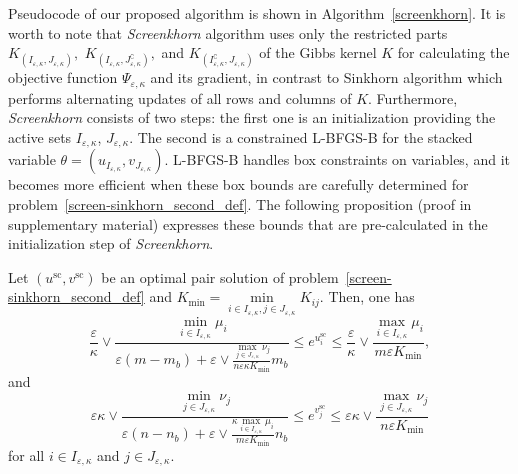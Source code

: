 Pseudocode of our proposed algorithm is shown in Algorithm~\ref{screenkhorn}. %
It is worth to note that \emph{Screenkhorn} algorithm uses only the restricted parts $K_{(I_{\varepsilon,\kappa}, J_{\varepsilon,\kappa})},$ $K_{(I_{\varepsilon,\kappa}, J^\complement_{\varepsilon,\kappa})},$ and $K_{(I^\complement_{\varepsilon,\kappa}, J_{\varepsilon,\kappa})}$ of the Gibbs kernel $K$ for calculating the objective function $\Psi_{\varepsilon, \kappa}$ and its gradient, in contrast to Sinkhorn algorithm which performs alternating updates of all rows and columns of $K.$
Furthermore, \emph{Screenkhorn} consists of two steps: the first one is an initialization providing the active sets $I_{\varepsilon,\kappa}$, $J_{\varepsilon,\kappa}$. 
The second is a constrained L-BFGS-B for the stacked variable $\theta=(u_{I_{\varepsilon,\kappa}},v_{J_{\varepsilon,\kappa}}).$ 
L-BFGS-B handles box constraints on variables, and it becomes more efficient when these box bounds are carefully determined for problem~\eqref{screen-sinkhorn_second_def}. 
The following proposition (proof in supplementary material) expresses these bounds that are pre-calculated in the initialization step of \emph{Screenkhorn}.
\begin{proposition}
\label{prop:bounds_of_usc_and_vsc}
Let $(u^{\text{sc}}, v^{\text{sc}})$ be an optimal pair solution of problem~\eqref{screen-sinkhorn_second_def} and $K_{\min} = \min\limits_{i\in I_{\varepsilon,\kappa},j \in J_{\varepsilon,\kappa}}K_{ij}$. Then,
one has
\begin{equation}
\label{bound_on_u}
\frac \varepsilon\kappa \vee \frac{\min_{i \in I_{\varepsilon,\kappa}}\mu_i}{\varepsilon (m- m_b) + \varepsilon \vee \frac{\max_{j\in J_{\varepsilon,\kappa}} \nu_j}{n\varepsilon\kappa K_{\min}} m_b} \leq e^{u^{\text{sc}}_i} \leq \frac \varepsilon\kappa\vee \frac{\max_{i \in I_{\varepsilon,\kappa}} \mu_i}{m\varepsilon K_{\min}},
\end{equation}
and
\begin{equation}
\label{bound_on_v}
\varepsilon\kappa \vee \frac{\min_{j \in J_{\varepsilon,\kappa}}\nu_j}{\varepsilon(n- n_b) + \varepsilon \vee \frac{\kappa\max_{i\in I_{\varepsilon,\kappa}} \mu_i}{m\varepsilon K_{\min} } n_b} \leq e^{v^{\text{sc}}_j} \leq \varepsilon\kappa \vee \frac{\max_{j \in J_{\varepsilon,\kappa}} \nu_j}{n\varepsilon K_{\min} }
\end{equation}
for all $i\in I_{\varepsilon,\kappa}$ and $j\in J_{\varepsilon,\kappa}$.
\end{proposition}
